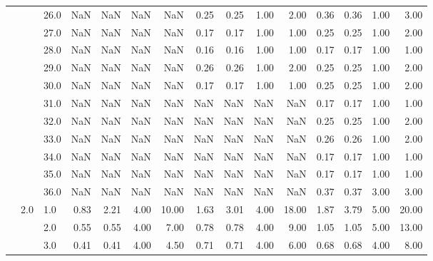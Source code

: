 \begin{tabular}{lllrrrrrrrrrrrr}
       &     & 26.0 &        NaN &       NaN &  NaN &    NaN &       0.25 &      0.25 & 1.00 &   2.00 &       0.36 &      0.36 & 1.00 &   3.00 \\
       &     & 27.0 &        NaN &       NaN &  NaN &    NaN &       0.17 &      0.17 & 1.00 &   1.00 &       0.25 &      0.25 & 1.00 &   2.00 \\
       &     & 28.0 &        NaN &       NaN &  NaN &    NaN &       0.16 &      0.16 & 1.00 &   1.00 &       0.17 &      0.17 & 1.00 &   1.00 \\
       &     & 29.0 &        NaN &       NaN &  NaN &    NaN &       0.26 &      0.26 & 1.00 &   2.00 &       0.25 &      0.25 & 1.00 &   2.00 \\
       &     & 30.0 &        NaN &       NaN &  NaN &    NaN &       0.17 &      0.17 & 1.00 &   1.00 &       0.25 &      0.25 & 1.00 &   2.00 \\
       &     & 31.0 &        NaN &       NaN &  NaN &    NaN &        NaN &       NaN &  NaN &    NaN &       0.17 &      0.17 & 1.00 &   1.00 \\
       &     & 32.0 &        NaN &       NaN &  NaN &    NaN &        NaN &       NaN &  NaN &    NaN &       0.25 &      0.25 & 1.00 &   2.00 \\
       &     & 33.0 &        NaN &       NaN &  NaN &    NaN &        NaN &       NaN &  NaN &    NaN &       0.26 &      0.26 & 1.00 &   2.00 \\
       &     & 34.0 &        NaN &       NaN &  NaN &    NaN &        NaN &       NaN &  NaN &    NaN &       0.17 &      0.17 & 1.00 &   1.00 \\
       &     & 35.0 &        NaN &       NaN &  NaN &    NaN &        NaN &       NaN &  NaN &    NaN &       0.17 &      0.17 & 1.00 &   1.00 \\
       &     & 36.0 &        NaN &       NaN &  NaN &    NaN &        NaN &       NaN &  NaN &    NaN &       0.37 &      0.37 & 3.00 &   3.00 \\
       & 2.0 & 1.0  &       0.83 &      2.21 & 4.00 &  10.00 &       1.63 &      3.01 & 4.00 &  18.00 &       1.87 &      3.79 & 5.00 &  20.00 \\
       &     & 2.0  &       0.55 &      0.55 & 4.00 &   7.00 &       0.78 &      0.78 & 4.00 &   9.00 &       1.05 &      1.05 & 5.00 &  13.00 \\
       &     & 3.0  &       0.41 &      0.41 & 4.00 &   4.50 &       0.71 &      0.71 & 4.00 &   6.00 &       0.68 &      0.68 & 4.00 &   8.00 \\

\end{tabular}
